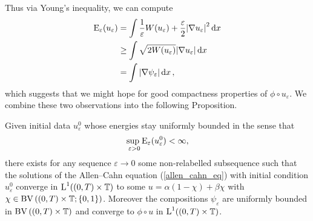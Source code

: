 Thus via Young's inequality, we can compute
\begin{align}
	\operatorname{E}_{ \varepsilon } ( u_{ \varepsilon } )
	& =
	\int
		\frac{ 1 }{ \varepsilon }
		W ( u_{ \varepsilon } ) 
		+
		\frac{ \varepsilon }{ 2 }
		\abs{ \nabla u_{ \varepsilon } }^{ 2 }
	\dd{ x }
	\notag
	\\
	& \geq
	\int
		\sqrt{ 2 W ( u_{ \varepsilon } ) }
		\abs{ \nabla u_{ \varepsilon } }
	\dd{ x }
	\notag
	\\
	& =
	\int
		\abs{ \nabla \psi_{ \varepsilon} }
	\dd{ x }
	\label{modica_mortula_trick},
\end{align}
which suggests that we might hope for good compactness properties of $ \phi \circ u_{ \varepsilon } $.
We combine these two observations into the following Proposition.

\begin{proposition}
	\label{initial_convergence_result}
	Given initial data $ u_{ \varepsilon }^{ 0 } $ whose energies stay uniformly bounded in the sense that
	\begin{equation}
		\sup_{ \ \varepsilon > 0 }
			\operatorname{E}_{ \varepsilon } ( u_{ \varepsilon }^{ 0 } ) 
		< 
		\infty,
	\end{equation}
	there exists for any sequence $ \varepsilon \to 0 $ some non-relabelled subsequence such that the solutions of the Allen--Cahn equation (\ref{allen_cahn_eq}) with initial condition $ u_{ \varepsilon }^{ 0 } $ converge in $ \operatorname{L}^{ 1 } ( ( 0, T ) \times \operatorname{\mathbb{T}} ) $ to some $ u = \alpha ( 1 - \chi ) + \beta \chi $ with $ \chi \in \operatorname{BV} \left( ( 0 , T ) \times \operatorname{\mathbb{T}} ; \{ 0 , 1 \} \right) $. Moreover the compositions $ \psi_{ \varepsilon } $ are uniformly bounded in $ \operatorname{BV} \left( ( 0, T ) \times \operatorname{\mathbb{T}} \right) $ and converge to $ \phi \circ u $ in $ \operatorname{L}^{ 1 } ( ( 0 , T ) \times \operatorname{\mathbb{T}} ) $.
\end{proposition}

